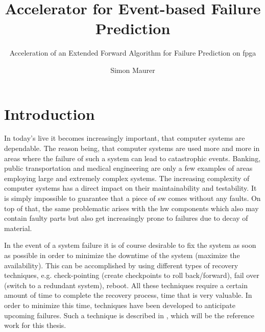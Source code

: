 \documentclass[mscthesis]{usiinfthesis}
\title{Accelerator for Event-based Failure Prediction} %
\subtitle{Acceleration of an Extended Forward Algorithm for Failure Prediction
    on \acrshort{fpga}}
\author{Simon Maurer} %
\begin{document}
\maketitle %

\frontmatter %

\begin{abstract}
\end{abstract}

%

\begin{acknowledgements}
\end{acknowledgements}

\tableofcontents 
\listoffigures %
\listoftables %
\lstlistoflistings

\mainmatter

\chapter{Introduction}
\label{ch:intro}
\glsresetall %

In today's live it becomes increasingly important, that computer systems are
dependable. The reason being, that computer systems are used more and more in
areas where the failure of such a system can lead to catastrophic events.
Banking, public transportation and medical engineering are only a few examples
of areas employing large and extremely complex systems. The increasing
complexity of computer systems has a direct impact on their maintainability and
testability. It is simply impossible to guarantee that a piece of \gls{sw} comes
without any faults. On top of that, the same problematic arises with the
\gls{hw} components which also may contain faulty parts but also get
increasingly prone to failures due to decay of material.

In the event of a system failure it is of course desirable to fix the system as
soon as possible in order to minimize the downtime of the system (maximize the
availability). This can be accomplished by using different types of recovery
techniques, e.g. check-pointing (create checkpoints to roll back/forward), fail
over (switch to a redundant system), reboot. All these techniques require
a certain amount of time to complete the recovery process, time that is very
valuable. In order to minimize this time, techniques have been developed to
anticipate upcoming failures. Such a technique is described in
\cite{salfner08}, which will be the reference work for this thesis.
\end{document}
